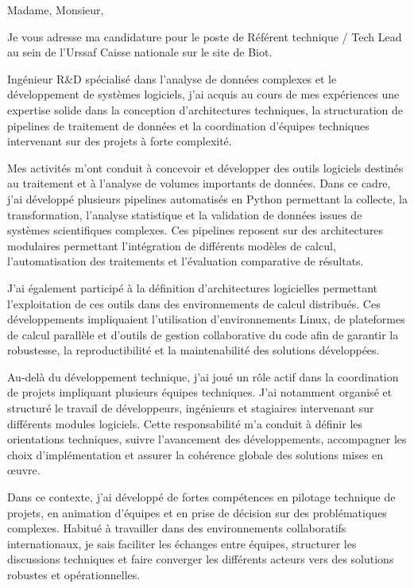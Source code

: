 \documentclass[11pt,a4paper]{altacv}
\begin{document}
{\color{body}

Madame, Monsieur,

Je vous adresse ma candidature pour le poste de Référent technique / Tech Lead au sein de l’Urssaf Caisse nationale sur le site de Biot.

Ingénieur R\&D spécialisé dans l’analyse de données complexes et le développement de systèmes logiciels, j’ai acquis au cours de mes expériences une expertise solide dans la conception d’architectures techniques, la structuration de pipelines de traitement de données et la coordination d’équipes techniques intervenant sur des projets à forte complexité.

Mes activités m’ont conduit à concevoir et développer des outils logiciels destinés au traitement et à l’analyse de volumes importants de données. Dans ce cadre, j’ai développé plusieurs pipelines automatisés en Python permettant la collecte, la transformation, l’analyse statistique et la validation de données issues de systèmes scientifiques complexes. Ces pipelines reposent sur des architectures modulaires permettant l’intégration de différents modèles de calcul, l’automatisation des traitements et l’évaluation comparative de résultats.

J’ai également participé à la définition d’architectures logicielles permettant l’exploitation de ces outils dans des environnements de calcul distribués. Ces développements impliquaient l’utilisation d’environnements Linux, de plateformes de calcul parallèle et d’outils de gestion collaborative du code afin de garantir la robustesse, la reproductibilité et la maintenabilité des solutions développées.

Au-delà du développement technique, j’ai joué un rôle actif dans la coordination de projets impliquant plusieurs équipes techniques. J’ai notamment organisé et structuré le travail de développeurs, ingénieurs et stagiaires intervenant sur différents modules logiciels. Cette responsabilité m’a conduit à définir les orientations techniques, suivre l’avancement des développements, accompagner les choix d’implémentation et assurer la cohérence globale des solutions mises en œuvre.

Dans ce contexte, j’ai développé de fortes compétences en pilotage technique de projets, en animation d’équipes et en prise de décision sur des problématiques complexes. Habitué à travailler dans des environnements collaboratifs internationaux, je sais faciliter les échanges entre équipes, structurer les discussions techniques et faire converger les différents acteurs vers des solutions robustes et opérationnelles.

}
\end{document}
